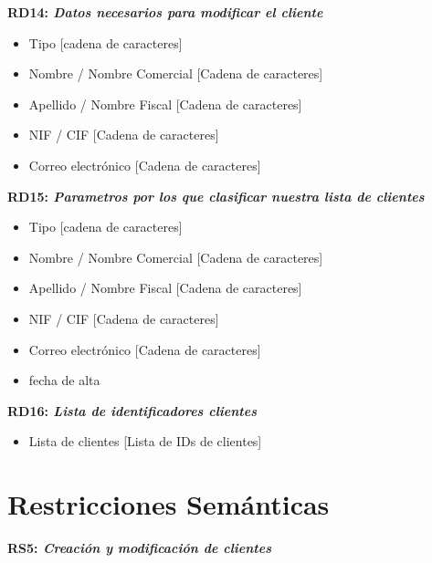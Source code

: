 \documentclass[paper=a4, fontsize=11pt, spanish]{scrartcl}
\begin{document}
\setlength{\parindent}{0em}
\textbf{RD14: \textit{Datos necesarios para modificar el cliente}}
\setlength{\parindent}{2em}
\begin{itemize}
	
	\item Tipo [cadena de caracteres]
	
	\item Nombre / Nombre Comercial [Cadena de caracteres]
	
	\item Apellido / Nombre Fiscal [Cadena de caracteres]
	
	\item NIF / CIF [Cadena de caracteres]
	
	\item Correo electrónico [Cadena de caracteres]
	
\end{itemize}

\setlength{\parindent}{0em}
\textbf{RD15: \textit{Parametros por los que clasificar nuestra lista de clientes}}
\setlength{\parindent}{2em}
\begin{itemize}
	\item Tipo [cadena de caracteres]
	
	\item Nombre / Nombre Comercial [Cadena de caracteres]
	
	\item Apellido / Nombre Fiscal [Cadena de caracteres]
	
	\item NIF / CIF [Cadena de caracteres]
	
	\item Correo electrónico [Cadena de caracteres]
	
	\item fecha de alta
\end{itemize}

\setlength{\parindent}{0em}
\textbf{RD16: \textit{Lista de identificadores clientes}}
\setlength{\parindent}{2em}
\begin{itemize}
	\item Lista de clientes [Lista de IDs de clientes]
\end{itemize}

\section{Restricciones Semánticas}
\setlength{\parindent}{0em}
\textbf{RS5: \textit{Creación y modificación de clientes}}
\setlength{\parindent}{2em}
\end{document}
